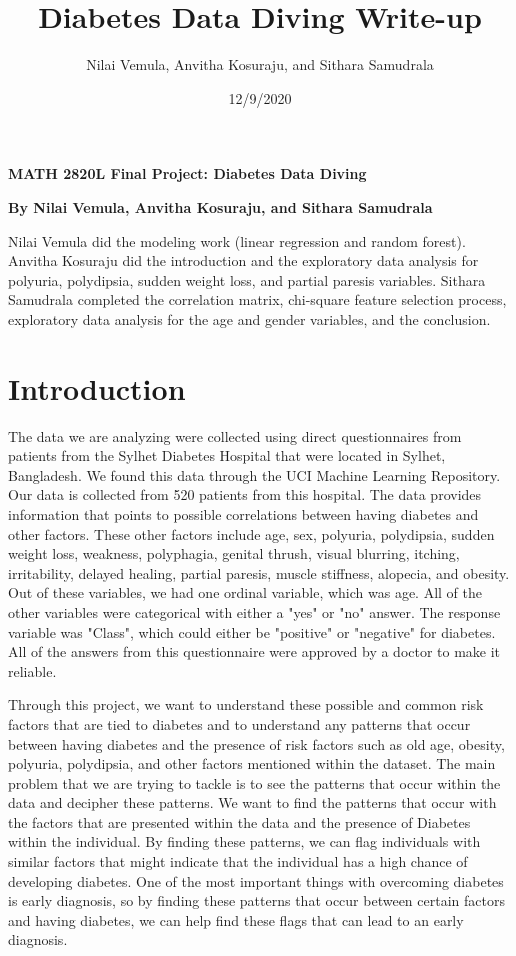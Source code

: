 \documentclass[
]{article}
\title{Diabetes Data Diving Write-up}
\author{Nilai Vemula, Anvitha Kosuraju, and Sithara Samudrala}
\date{12/9/2020}
\begin{document}
\maketitle

\textbf{MATH 2820L Final Project: Diabetes Data Diving}

\textbf{By Nilai Vemula, Anvitha Kosuraju, and Sithara Samudrala}

Nilai Vemula did the modeling work (linear regression and random
forest). Anvitha Kosuraju did the introduction and the exploratory data
analysis for polyuria, polydipsia, sudden weight loss, and partial
paresis variables. Sithara Samudrala completed the correlation matrix,
chi-square feature selection process, exploratory data analysis for the
age and gender variables, and the conclusion.

\tableofcontents

\hypertarget{header-n815}{%
\section{Introduction}\label{header-n815}}

The data we are analyzing were collected using direct questionnaires
from patients from the Sylhet Diabetes Hospital that were located in
Sylhet, Bangladesh. We found this data through the UCI Machine Learning
Repository. Our data is collected from 520 patients from this hospital.
The data provides information that points to possible correlations
between having diabetes and other factors. These other factors include
age, sex, polyuria, polydipsia, sudden weight loss, weakness,
polyphagia, genital thrush, visual blurring, itching, irritability,
delayed healing, partial paresis, muscle stiffness, alopecia, and
obesity. Out of these variables, we had one ordinal variable, which was
age. All of the other variables were categorical with either a "yes" or
"no" answer. The response variable was "Class", which could either be
"positive" or "negative" for diabetes. All of the answers from this
questionnaire were approved by a doctor to make it reliable.

Through this project, we want to understand these possible and common
risk factors that are tied to diabetes and to understand any patterns
that occur between having diabetes and the presence of risk factors such
as old age, obesity, polyuria, polydipsia, and other factors mentioned
within the dataset. The main problem that we are trying to tackle is to
see the patterns that occur within the data and decipher these patterns.
We want to find the patterns that occur with the factors that are
presented within the data and the presence of Diabetes within the
individual. By finding these patterns, we can flag individuals with
similar factors that might indicate that the individual has a high
chance of developing diabetes. One of the most important things with
overcoming diabetes is early diagnosis, so by finding these patterns
that occur between certain factors and having diabetes, we can help find
these flags that can lead to an early diagnosis.
\end{document}
